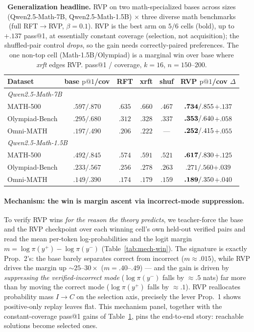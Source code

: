 \begin{table}[htbp]
\centering
\caption{\textbf{Generalization headline.} RVP on two math-specialized bases across sizes
(Qwen2.5-Math-7B, Qwen2.5-Math-1.5B) $\times$ three diverse math benchmarks (full RFT$\to$RVP,
$\beta{=}0.1$). RVP is the best arm on $5/6$ cells (bold), up to $+.137$ pass@1, at essentially
constant coverage (selection, not acquisition); the shuffled-pair control \emph{drops}, so the
gain needs correctly-paired preferences. The one non-top cell (Math-1.5B/Olympiad) is a marginal
win over base where \emph{xrft} edges RVP. pass@1 / coverage, $k{=}16$, $n{=}150$--$200$.}
\label{tab:genmath}
\begin{tabular}{lccccc}
\toprule
Dataset & base $\text{p}@1$/cov & RFT & xrft & shuf & \textbf{RVP} $\text{p}@1$/cov \quad$\Delta$ \\
\midrule
\multicolumn{6}{l}{\emph{Qwen2.5-Math-7B}} \\
MATH-500       & $.597/.870$ & $.635$ & $.660$ & $.467$ & $\textbf{.734}/.855$\quad$\mathbf{+.137}$ \\
Olympiad-Bench & $.295/.680$ & $.312$ & $.328$ & $.337$ & $\textbf{.353}/.640$\quad$\mathbf{+.058}$ \\
Omni-MATH      & $.197/.490$ & $.206$ & $.222$ & ---    & $\textbf{.252}/.415$\quad$\mathbf{+.055}$ \\
\midrule
\multicolumn{6}{l}{\emph{Qwen2.5-Math-1.5B}} \\
MATH-500       & $.492/.845$ & $.574$ & $.591$ & $.521$ & $\textbf{.617}/.830$\quad$\mathbf{+.125}$ \\
Olympiad-Bench & $.233/.567$ & $.256$ & $.278$ & $.263$ & $.271/.560$\quad$+.039$ \\
Omni-MATH      & $.149/.390$ & $.174$ & $.179$ & $.159$ & $\textbf{.189}/.350$\quad$\mathbf{+.040}$ \\
\bottomrule
\end{tabular}
\end{table}

\paragraph{Mechanism: the win is margin ascent via incorrect-mode suppression.}
To verify RVP wins \emph{for the reason the theory predicts}, we teacher-force the base and the
RVP checkpoint over each winning cell's own held-out verified pairs and read the mean per-token
log-probabilities and the logit margin $m=\log\pi(y^{+})-\log\pi(y^{-})$
(Table~\ref{tab:mech-win}). The signature is exactly Prop.~2's: the base barely separates correct
from incorrect ($m\approx.015$), while RVP drives the margin up $\sim25$--$30\times$
($m=.40$--$.49$) --- and the gain is driven by \emph{suppressing the verified-incorrect mode}
($\log\pi(y^{-})$ falls by $\approx.5$ nats) far more than by moving the correct mode
($\log\pi(y^{+})$ falls by $\approx.1$). RVP reallocates probability mass $I\!\to\!C$ on the
selection axis, precisely the lever Prop.~1 shows positive-only replay leaves flat. This mechanism
panel, together with the constant-coverage pass@1 gains of Table~\ref{tab:genmath}, pins the
end-to-end story: reachable solutions become selected ones.

